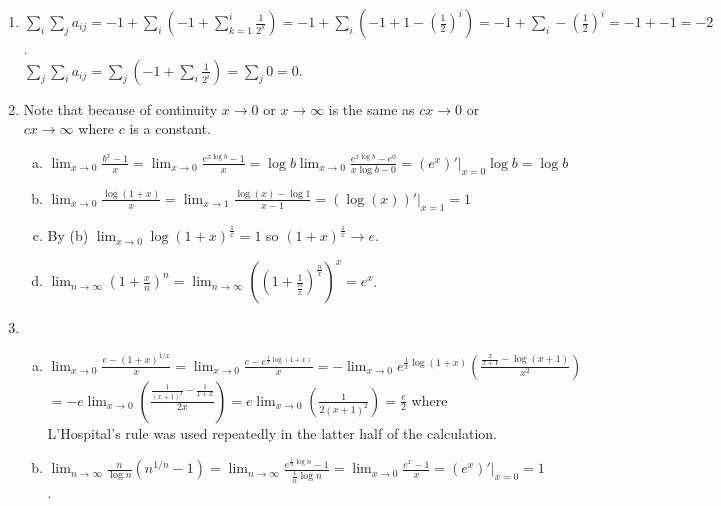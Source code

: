 \documentclass{article}
\begin{document}
\begin{enumerate}
\item $\sum\limits_i \sum\limits_j a_{ij} = -1 + \sum\limits_i (-1 + \sum\limits_{k=1}^{i} \frac{1}{2^k})=-1+\sum\limits_i (-1 + 1-(\frac{1}{2})^i)=-1 + \sum\limits_i -(\frac{1}{2})^i= -1 + -1 = -2$.\\
$\sum\limits_j \sum\limits_i a_{ij}=\sum\limits_j (-1+\sum\limits_i \frac{1}{2^i}) = \sum\limits_j 0 = 0$.\\
\setcounter{enumi}{3}
\item
Note that because of continuity $x\rightarrow 0$ or $x\rightarrow \infty$ is the same as $cx \rightarrow 0$ or $cx \rightarrow \infty$ where $c$ is a constant. 
\begin{enumerate}[(a)]
\item $\displaystyle\lim_{x\rightarrow 0} \frac{b^x-1}{x} = \displaystyle\lim_{x\rightarrow 0} \frac{e^{x\log b}-1}{x}=\log b \displaystyle\lim_{x\rightarrow 0} \frac{e^{x\log b}-e^0}{x\log b - 0} = (e^x)'\bigg|_{x=0} \log b = \log b$\\
\item $\displaystyle\lim_{x\rightarrow 0} \frac{\log(1+x)}{x} = \displaystyle\lim_{x\rightarrow 1} \frac{\log(x)-\log 1}{x-1} = (\log(x))'\bigg|_{x=1} =1$\\
\item By (b) $\displaystyle\lim_{x\rightarrow 0} \log (1+x)^{\frac{1}{x}} =1$ so $(1+x)^{\frac{1}{x}}\rightarrow e$. \\
\item $\displaystyle\lim_{n\rightarrow \infty} \left(1+\frac{x}{n}\right)^n = \displaystyle\lim_{n\rightarrow \infty} \left(\left(1+\frac{1}{\frac{n}{x}}\right)^{\frac{n}{x}}\right)^x=e^x$.
\end{enumerate}
\item
\begin{enumerate}[(a)]
\item $\displaystyle\lim_{x\rightarrow 0} \frac{e-(1+x)^{1/x}}{x} =\displaystyle\lim_{x\rightarrow 0} \frac{e-e^{\frac{1}{x} \log(1+x)}}{x} =-\displaystyle\lim_{x\rightarrow 0} e^{\frac{1}{x} \log(1+x)} \left(\frac{\frac{x}{x+1}-\log(x+1)}{x^2}\right)$\\
$=-e \displaystyle\lim_{x\rightarrow 0} \left(\frac{\frac{1}{(x+1)^2}-\frac{1}{1+x}}{2x}\right)=e \displaystyle\lim_{x\rightarrow 0} \left(\frac{1}{2(x+1)^2}\right)=\frac{e}{2}$ where L'Hospital's rule was used repeatedly in the latter half of the calculation.
\item $\displaystyle\lim_{n\rightarrow \infty} \frac{n}{\log n} (n^{1/n} - 1) = \displaystyle\lim_{n\rightarrow \infty}  \frac{e^{\frac{1}{n}\log n} - 1}{\frac{1}{n}\log n} =\lim_{x\rightarrow 0} \frac{e^x - 1}{x} = (e^x)'\bigg|_{x=0} = 1$.\\

\end{enumerate}
\end{enumerate}
\end{document}
